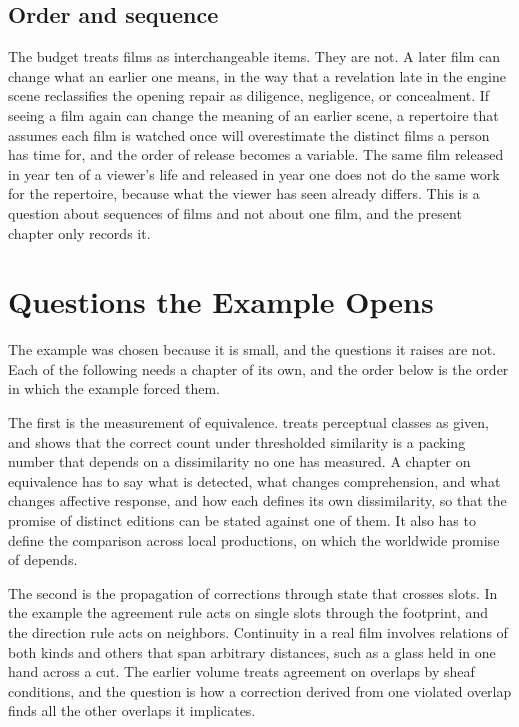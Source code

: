 \documentclass[11pt,twoside,openright]{book}
\theoremstyle{plain}
\theoremstyle{definition}
\theoremstyle{remark}
\begin{document}
\subsection{Order and sequence}

The budget treats films as interchangeable items. They are not. A later film can change what an earlier one means, in the way that a revelation late in the engine scene reclassifies the opening repair as diligence, negligence, or concealment. If seeing a film again can change the meaning of an earlier scene, a repertoire that assumes each film is watched once will overestimate the distinct films a person has time for, and the order of release becomes a variable. The same film released in year ten of a viewer's life and released in year one does not do the same work for the repertoire, because what the viewer has seen already differs. This is a question about sequences of films and not about one film, and the present chapter only records it.

\section{Questions the Example Opens}\label{sec:open}

The example was chosen because it is small, and the questions it raises are not. Each of the following needs a chapter of its own, and the order below is the order in which the example forced them.

The first is the measurement of equivalence.  treats perceptual classes as given, and  shows that the correct count under thresholded similarity is a packing number that depends on a dissimilarity no one has measured. A chapter on equivalence has to say what is detected, what changes comprehension, and what changes affective response, and how each defines its own dissimilarity, so that the promise of distinct editions can be stated against one of them. It also has to define the comparison across local productions, on which the worldwide promise of  depends.

The second is the propagation of corrections through state that crosses slots. In the example the agreement rule acts on single slots through the footprint, and the direction rule acts on neighbors. Continuity in a real film involves relations of both kinds and others that span arbitrary distances, such as a glass held in one hand across a cut. The earlier volume treats agreement on overlaps by sheaf conditions, and the question is how a correction derived from one violated overlap finds all the other overlaps it implicates.
\end{document}
